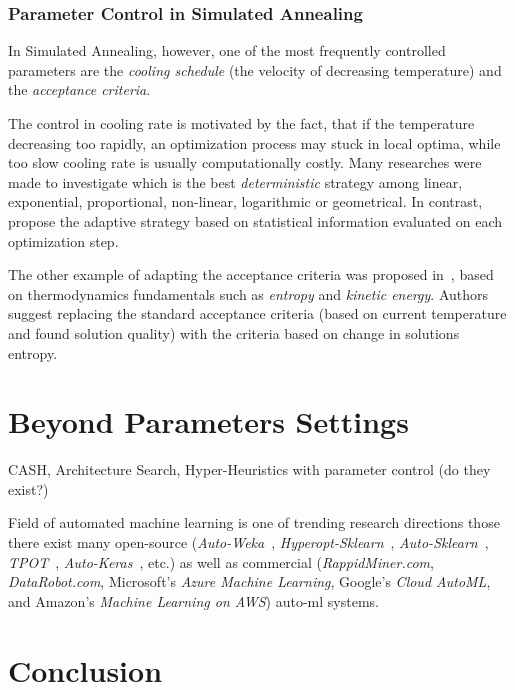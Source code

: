 \subsubsection{Parameter Control in Simulated Annealing}
In Simulated Annealing, however, one of the most frequently controlled parameters are the \textit{cooling schedule} (the velocity of decreasing temperature) and the \textit{acceptance criteria}.

The control in cooling rate is motivated by the fact, that if the temperature decreasing too rapidly, an optimization process may stuck in local optima, while too slow cooling rate is usually computationally costly. Many researches were made to investigate which is the best \textit{deterministic} strategy among linear, exponential, proportional, non-linear, logarithmic or geometrical. In contrast, \cite{karabin2020simulated} propose the adaptive strategy based on statistical information evaluated on each optimization step.

The other example of adapting the acceptance criteria was proposed in~\cite{ghandeshtani2019entropy}, based on thermodynamics fundamentals such as \textit{entropy} and \textit{kinetic energy}. Authors suggest replacing the standard acceptance criteria (based on current temperature and found solution quality) with the criteria based on change in solutions entropy.


\section{Beyond Parameters Settings} 

CASH, Architecture Search, Hyper-Heuristics with parameter control (do they exist?)


Field of automated machine learning is one of trending research directions those there exist many open-source (\textit{Auto-Weka}~\cite{thornton2013auto}, \textit{Hyperopt-Sklearn}~\cite{komer2014hyperopt}, \textit{Auto-Sklearn}~\cite{feurer2015efficient}, \textit{TPOT}~\cite{olson2019tpot}, \textit{Auto-Keras}~\cite{jin2019auto}, etc.) as well as commercial (\textit{RappidMiner.com}, \textit{DataRobot.com}, Microsoft’s \textit{Azure Machine Learning}, Google’s \textit{Cloud AutoML}, and Amazon's \textit{Machine Learning on AWS}) auto-ml systems.







\section{Conclusion}

